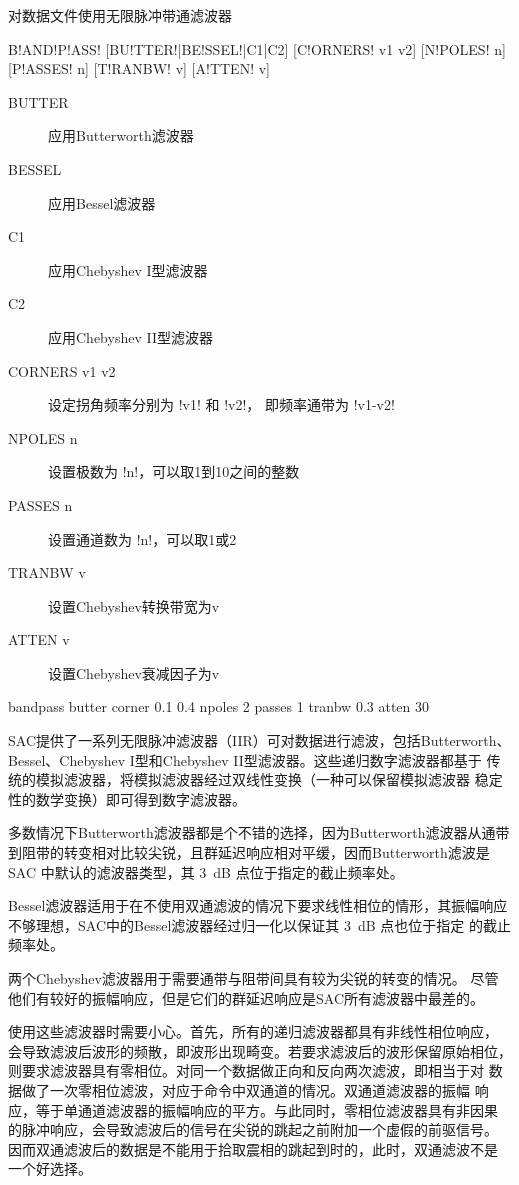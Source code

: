 \label{cmd:bandpass}

对数据文件使用无限脉冲带通滤波器

\begin{SACSTX}
B!AND!P!ASS! [BU!TTER!|BE!SSEL!|C1|C2] [C!ORNERS! v1 v2] [N!POLES! n] [P!ASSES! n]
    [T!RANBW! v] [A!TTEN! v]
\end{SACSTX}

\begin{description}
\item [BUTTER] 应用Butterworth滤波器
\item [BESSEL] 应用Bessel滤波器
\item [C1] 应用Chebyshev I型滤波器
\item [C2] 应用Chebyshev II型滤波器
\item [CORNERS v1 v2] 设定拐角频率分别为 !v1! 和 !v2!，
    即频率通带为 !v1-v2!
\item [NPOLES n] 设置极数为 !n!，可以取1到10之间的整数
\item [PASSES n] 设置通道数为 !n!，可以取1或2
\item [TRANBW v] 设置Chebyshev转换带宽为v
\item [ATTEN v] 设置Chebyshev衰减因子为v
\end{description}

\begin{SACDFT}
bandpass butter corner 0.1 0.4 npoles 2 passes 1 tranbw 0.3 atten 30
\end{SACDFT}

SAC提供了一系列无限脉冲滤波器（IIR）可对数据进行滤波，包括Butterworth、
Bessel、Chebyshev I型和Chebyshev II型滤波器。这些递归数字滤波器都基于
传统的模拟滤波器，将模拟滤波器经过双线性变换（一种可以保留模拟滤波器
稳定性的数学变换）即可得到数字滤波器。

多数情况下Butterworth滤波器都是个不错的选择，因为Butterworth滤波器从通带
到阻带的转变相对比较尖锐，且群延迟响应相对平缓，因而Butterworth滤波是SAC
中默认的滤波器类型，其 \SI{3}{dB} 点位于指定的截止频率处。

Bessel滤波器适用于在不使用双通滤波的情况下要求线性相位的情形，其振幅响应
不够理想，SAC中的Bessel滤波器经过归一化以保证其 \SI{3}{\dB} 点也位于指定
的截止频率处。

两个Chebyshev滤波器用于需要通带与阻带间具有较为尖锐的转变的情况。
尽管他们有较好的振幅响应，但是它们的群延迟响应是SAC所有滤波器中最差的。

使用这些滤波器时需要小心。首先，所有的递归滤波器都具有非线性相位响应，
会导致滤波后波形的频散，即波形出现畸变。若要求滤波后的波形保留原始相位，
则要求滤波器具有零相位。对同一个数据做正向和反向两次滤波，即相当于对
数据做了一次零相位滤波，对应于命令中双通道的情况。双通道滤波器的振幅
响应，等于单通道滤波器的振幅响应的平方。与此同时，零相位滤波器具有非因果
的脉冲响应，会导致滤波后的信号在尖锐的跳起之前附加一个虚假的前驱信号。
因而双通滤波后的数据是不能用于拾取震相的跳起到时的，此时，双通滤波不是
一个好选择。

